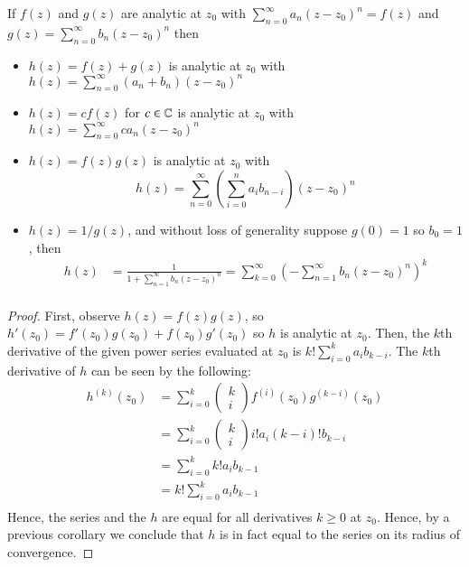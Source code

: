 \begin{theorem}
    If $f(z)$ and $g(z)$ are analytic at $z_0$ with $\sum_{n=0}^{\infty}a_n(z-z_0)^n = f(z)$ and $g(z) = \sum_{n=0}^{\infty}b_n(z-z_0)^n$ then \begin{itemize}
        \item $h(z) = f(z) + g(z)$ is analytic at $z_0$ with $h(z) = \sum_{n=0}^{\infty}(a_n+b_n)(z-z_0)^n$
        \item $h(z) = cf(z)$ for $c \in \mathbb C$ is analytic at $z_0$ with $h(z) = \sum_{n=0}^{\infty}ca_n(z-z_0)^n$
        \item $h(z) = f(z)g(z)$ is analytic at $z_0$ with $$h(z) = \sum_{n=0}^{\infty}\left(\sum_{i=0}^na_ib_{n-i}\right)(z-z_0)^n$$
        \item $h(z) = 1/g(z)$, and without loss of generality suppose $g(0) = 1$ so $b_0 = 1$, then \begin{align*}
                h(z) &= \frac{1}{1+\sum_{n=1}^{\infty}b_n(z-z_0)^n} = \sum_{k=0}^{\infty}\left(-\sum_{n=1}^{\infty}b_n(z-z_0)^n\right)^k \\
        \end{align*}
        \end{itemize}
\end{theorem}
\begin{proof}
    First, observe $h(z) = f(z)g(z)$, so $h'(z_0) = f'(z_0)g(z_0) + f(z_0)g'(z_0)$ so $h$ is analytic at $z_0$. Then, the $k$th derivative of the given power series evaluated at $z_0$ is $k!\sum_{i=0}^ka_ib_{k-i}$. The $k$th derivative of $h$ can be seen by the following: \begin{align*}
        h^{(k)}(z_0) &= \sum_{i=0}^k\left(\begin{array}{c} k \\ i \end{array}\right)f^{(i)}(z_0)g^{(k-i)}(z_0) \\
            &= \sum_{i=0}^k\left(\begin{array}{c} k \\ i \end{array}\right)i!a_i(k-i)!b_{k-i} \\
            &= \sum_{i=0}^k k!a_ib_{k-1} \\
            &= k!\sum_{i=0}^k a_ib_{k-1} \\
    \end{align*}
    Hence, the series and the $h$ are equal for all derivatives $k \geq 0$ at $z_0$. Hence, by a previous corollary we conclude that $h$ is in fact equal to the series on its radius of convergence.
\end{proof}

